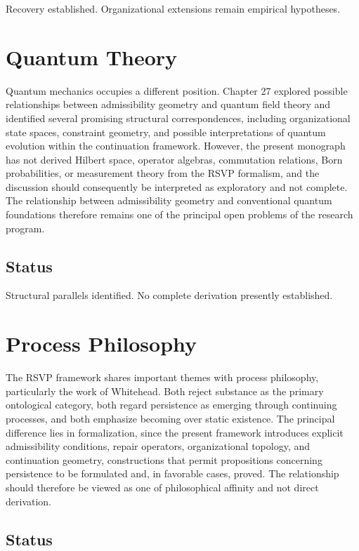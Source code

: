 \documentclass[11pt,oneside]{book}
\numberwithin{equation}{chapter}
\theoremstyle{definition}
\theoremstyle{plain}
\begin{document}
Recovery established. Organizational extensions remain empirical
hypotheses.

\section{Quantum Theory}

Quantum mechanics occupies a different position. Chapter 27 explored possible relationships between admissibility geometry and quantum field theory and identified several promising structural correspondences, including organizational state spaces, constraint geometry, and possible interpretations of quantum evolution within the continuation framework. However, the present monograph has not derived Hilbert space, operator algebras, commutation relations, Born probabilities, or measurement theory from the RSVP formalism, and the discussion should consequently be interpreted as exploratory and not complete. The relationship between admissibility geometry and conventional quantum foundations therefore remains one of the principal open problems of the research program.

\subsection*{Status}

Structural parallels identified. No complete derivation presently
established.

\section{Process Philosophy}

The RSVP framework shares important themes with process philosophy, particularly the work of Whitehead. Both reject substance as the primary ontological category, both regard persistence as emerging through continuing processes, and both emphasize becoming over static existence. The principal difference lies in formalization, since the present framework introduces explicit admissibility conditions, repair operators, organizational topology, and continuation geometry, constructions that permit propositions concerning persistence to be formulated and, in favorable cases, proved. The relationship should therefore be viewed as one of philosophical affinity and not direct derivation.

\subsection*{Status}
\end{document}
